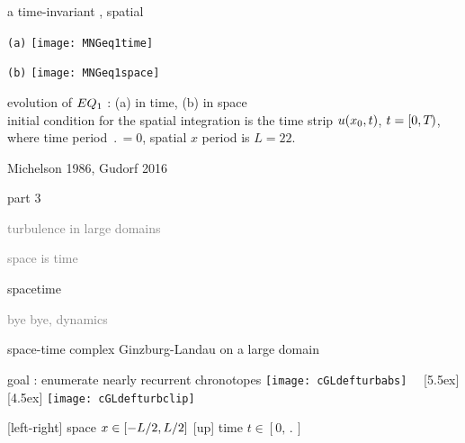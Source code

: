 \begin{frame}{a time-invariant \eqv, spatial \po}
\begin{center}
  \begin{minipage}[height=.45\textheight]{.45\textwidth}
    \centering \small{\texttt{(a)}}
    \texttt{[image: MNGeq1time]}
  \end{minipage}
  \begin{minipage}[height=.45\textheight]{.45\textwidth}
    \centering \small{\texttt{(b)}}
    \texttt{[image: MNGeq1space]}
  \end{minipage}
\end{center}
  evolution of $EQ_{1}$ : (a) in time, (b) in space
   \\
   initial condition for the spatial integration is the time strip
   $u(x_0,t)$, $t = [0,{T_{}})$, where time period
   $\period{} =0$, spatial $x$ period is $L=22$.

\vfill\hfill        Michelson 1986, Gudorf 2016
\end{frame}

\begin{frame}{part 3}
\begin{enumerate}
              \item
    \textcolor{gray}{\small
turbulence in large domains
              \item
space is time
    }
              \item {\Large
spacetime
    }\textcolor{gray}{\small
              \item
bye bye, dynamics
                    }
            \end{enumerate}
\end{frame}

\begin{frame}{space-time complex Ginzburg-Landau on a large domain}
\begin{block}{goal : enumerate nearly recurrent chronotopes}
  \texttt{[image: cGLdefturbabs]}%
~~\raisebox{+3.33ex}[5.5ex][4.5ex]
		 {\texttt{[image: cGLdefturbclip]}}
\end{block}

{\footnotesize
[left-right] space $x \in [-L/2,L/2]$
\qquad
{[up]} time $t\in [0,\period{}]$
}
\end{frame}

